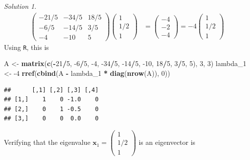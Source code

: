 \documentclass[
]{book}
\newenvironment{Shaded}{\begin{snugshade}}{\end{snugshade}}
\newcommand{\DecValTok}[1]{\textcolor[rgb]{0.00,0.00,0.81}{#1}}
\newcommand{\KeywordTok}[1]{\textcolor[rgb]{0.13,0.29,0.53}{\textbf{#1}}}
\newcommand{\NormalTok}[1]{#1}
\newcommand{\OperatorTok}[1]{\textcolor[rgb]{0.81,0.36,0.00}{\textbf{#1}}}
\newcommand{\StringTok}[1]{\textcolor[rgb]{0.31,0.60,0.02}{#1}}
\theoremstyle{definition}
\theoremstyle{definition}
\theoremstyle{definition}
\theoremstyle{definition}
\theoremstyle{remark}
\newtheorem*{solution}{Solution}
\begin{document}
\begin{solution}
\[\begin{aligned}
\begin{pmatrix} -21/5 & -34/5 & 18/5 \\ -6/5 & -14/5 & 3/5 \\ -4 & -10 & 5 \end{pmatrix} \begin{pmatrix} 1 \\ 1/2 \\ 1 \end{pmatrix} & = \begin{pmatrix} -4 \\ -2 \\ -4 \end{pmatrix}  = -4 \begin{pmatrix} 1 \\ 1/2 \\ 1 \end{pmatrix}
\end{aligned}
\]
Using \texttt{R}, this is

\begin{Shaded}
\begin{Highlighting}[]
\NormalTok{A <-}\StringTok{ }\KeywordTok{matrix}\NormalTok{(}\KeywordTok{c}\NormalTok{(}\OperatorTok{-}\DecValTok{21}\OperatorTok{/}\DecValTok{5}\NormalTok{, }\DecValTok{-6}\OperatorTok{/}\DecValTok{5}\NormalTok{, }\DecValTok{-4}\NormalTok{, }\DecValTok{-34}\OperatorTok{/}\DecValTok{5}\NormalTok{, }\DecValTok{-14}\OperatorTok{/}\DecValTok{5}\NormalTok{, }\DecValTok{-10}\NormalTok{, }\DecValTok{18}\OperatorTok{/}\DecValTok{5}\NormalTok{,  }\DecValTok{3}\OperatorTok{/}\DecValTok{5}\NormalTok{, }\DecValTok{5}\NormalTok{), }\DecValTok{3}\NormalTok{, }\DecValTok{3}\NormalTok{)}
\NormalTok{lambda_}\DecValTok{1}\NormalTok{ <-}\StringTok{ }\DecValTok{-4}
\KeywordTok{rref}\NormalTok{(}\KeywordTok{cbind}\NormalTok{(A }\OperatorTok{-}\StringTok{ }\NormalTok{lambda_}\DecValTok{1} \OperatorTok{*}\StringTok{ }\KeywordTok{diag}\NormalTok{(}\KeywordTok{nrow}\NormalTok{(A)), }\DecValTok{0}\NormalTok{))}
\end{Highlighting}
\end{Shaded}

\begin{verbatim}
##      [,1] [,2] [,3] [,4]
## [1,]    1    0 -1.0    0
## [2,]    0    1 -0.5    0
## [3,]    0    0  0.0    0
\end{verbatim}

Verifying that the eigenvalue \(\mathbf{x}_1 = \begin{pmatrix} 1 \\ 1/2 \\ 1 \end{pmatrix}\) is an eigenvector is


\end{solution}
\end{document}
